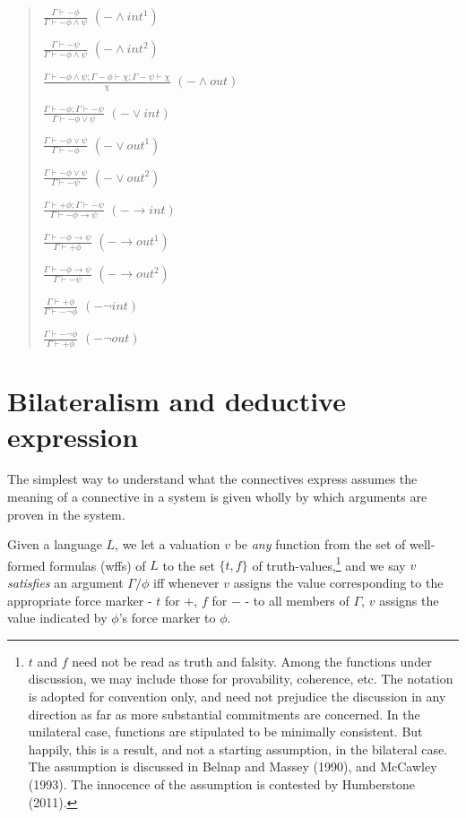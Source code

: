 \documentclass[]{article}
\begin{document}
\begin{quote}
$\frac{\Gamma \vdash -\phi}{\Gamma \vdash -\phi\wedge\psi}$ $(-\wedge int^{1})$ 

$\frac{\Gamma \vdash -\psi}{\Gamma \vdash -\phi\wedge\psi}$ $(-\wedge int^{2})$ 

$\frac{\Gamma \vdash -\phi\wedge\psi; \Gamma -\phi \vdash \chi; \Gamma -\psi \vdash \chi}{\chi}$ $(-\wedge out)$

$\frac{\Gamma \vdash -\phi; \Gamma \vdash -\psi}{\Gamma \vdash -\phi\vee\psi}$ $(-\vee int)$ 

$\frac{\Gamma \vdash -\phi\vee\psi}{\Gamma \vdash -\phi}$ $(-\vee out^{1})$ 

$\frac{\Gamma \vdash -\phi\vee\psi}{\Gamma \vdash -\psi}$ $(-\vee out^{2})$

$\frac{\Gamma \vdash +\phi; \Gamma \vdash -\psi}{\Gamma \vdash -\phi\rightarrow\psi}$ $(-\rightarrow int)$

$\frac{\Gamma \vdash -\phi\rightarrow\psi}{\Gamma \vdash +\phi}$ $(-\rightarrow out^{1})$

$\frac{\Gamma \vdash -\phi\rightarrow\psi}{\Gamma \vdash -\psi}$ $(-\rightarrow out^{2})$

$\frac{\Gamma \vdash +\phi}{\Gamma \vdash -\neg\phi}$ $(-\neg int)$

$\frac{\Gamma \vdash -\neg\phi}{\Gamma \vdash +\phi}$ $(-\neg out)$
\end{quote}

\section{Bilateralism and deductive expression}
The simplest way to understand what the connectives express assumes the meaning of a connective in a system is given wholly by which arguments are proven in the system.

Given a language $L$, we let a valuation $v$ be \textit{any} function from the set of well-formed formulas (wffs) of $L$ to the set $\{t, f\}$ of truth-values,\footnote{$t$ and $f$ need not be read as truth and falsity. Among the functions under discussion, we may include those for provability, coherence, etc. The notation is adopted for convention only, and need not prejudice the discussion in any direction as far as more substantial commitments are concerned. In the unilateral case, functions are stipulated to be minimally consistent. But happily, this is a result, and not a starting assumption, in the bilateral case. The assumption is discussed in Belnap and Massey (1990), and McCawley (1993). The innocence of the assumption is contested by Humberstone (2011).} and we say $v$ \textit{satisfies} an argument $\Gamma / \phi$ iff whenever $v$ assigns the value corresponding to the appropriate force marker - $t$ for $+$, $f$ for $-$ - to all members of $\Gamma$, $v$ assigns the value indicated by $\phi$'s force marker to $\phi$.
\end{document}
